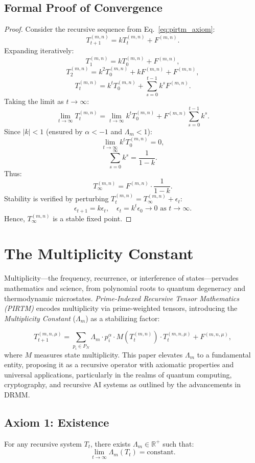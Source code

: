 \documentclass{article}
\theoremstyle{plain}
\begin{document}
\subsection{Formal Proof of Convergence}
\begin{proof}
Consider the recursive sequence from Eq.~\eqref{eq:pirtm_axiom}:
\[
T_{t+1}^{(m,n)} = k T_t^{(m,n)} + F^{(m,n)}.
\]
Expanding iteratively:
\[
T_1^{(m,n)} = k T_0^{(m,n)} + F^{(m,n)},
\]
\[
T_2^{(m,n)} = k^2 T_0^{(m,n)} + k F^{(m,n)} + F^{(m,n)},
\]
\[
T_t^{(m,n)} = k^t T_0^{(m,n)} + \sum_{s=0}^{t-1} k^s F^{(m,n)}.
\]
Taking the limit as \( t \to \infty \):
\[
\lim_{t \to \infty} T_t^{(m,n)} = \lim_{t \to \infty} k^t T_0^{(m,n)} + F^{(m,n)} \sum_{s=0}^{t-1} k^s.
\]
Since \( |k| < 1 \) (ensured by \( \alpha < -1 \) and \( \Lambda_m < 1 \)):
\[
\lim_{t \to \infty} k^t T_0^{(m,n)} = 0,
\]
\[
\sum_{s=0}^\infty k^s = \frac{1}{1 - k}.
\]
Thus:
\[
T_\infty^{(m,n)} = F^{(m,n)} \cdot \frac{1}{1 - k}.
\]
Stability is verified by perturbing \( T_t^{(m,n)} = T_\infty^{(m,n)} + \epsilon_t \):
\[
\epsilon_{t+1} = k \epsilon_t, \quad \epsilon_t = k^t \epsilon_0 \to 0 \text{ as } t \to \infty.
\]
Hence, \( T_\infty^{(m,n)} \) is a stable fixed point.
\end{proof}

\section{ The Multiplicity Constant}

Multiplicity---the frequency, recurrence, or interference of states---pervades mathematics and science, from polynomial roots to quantum degeneracy and thermodynamic microstates. \textit{Prime-Indexed Recursive Tensor Mathematics (PIRTM)} encodes multiplicity via prime-weighted tensors, introducing the \textit{Multiplicity Constant} ($\Lambda_m$) as a stabilizing factor:

\[
T_{t+1}^{(m, n, \mu)} = \sum_{p_i \in P_N} \Lambda_m \cdot p_i^\alpha \cdot M(T_t^{(m, n)}) \cdot T_t^{(m, n, \mu)} + F^{(m, n, \mu)},
\]
where $M$ measures state multiplicity. This paper elevates $\Lambda_m$ to a fundamental entity, proposing it as a recursive operator with axiomatic properties and universal applications, particularly in the realms of quantum computing, cryptography, and recursive AI systems as outlined by the advancements in DRMM.

\subsection{Axiom 1: Existence}
For any recursive system $T_t$, there exists $\Lambda_m \in \mathbb{R}^+$ such that:
\[
\lim_{t \to \infty} \Lambda_m(T_t) = \text{constant}.
\]
\end{document}
